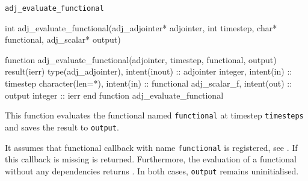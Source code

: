 \begin{boxwithtitle}{\texttt{adj_evaluate_functional}}
\begin{minipage}{\columnwidth}
\begin{ccode}
  int adj_evaluate_functional(adj_adjointer* adjointer, int timestep, 
                              char* functional, adj_scalar* output)
\end{ccode}
\begin{fortrancode}   
  function adj_evaluate_functional(adjointer, timestep, functional, output) 
           result(ierr)
    type(adj_adjointer), intent(inout) :: adjointer
    integer, intent(in) :: timestep
    character(len=*), intent(in) :: functional
    adj_scalar_f, intent(out) :: output
    integer :: ierr
  end function adj_evaluate_functional
\end{fortrancode}
\end{minipage}
\end{boxwithtitle}

This function evaluates the functional named \texttt{functional} at timestep \texttt{timesteps} and saves the result to \texttt{output}.

It assumes that functional callback with name \texttt{functional} is registered, see . 
If this callback is missing  is returned.
Furthermore, the evaluation of a functional without any dependencies returns . 
In both cases, \texttt{output} remains uninitialised.

